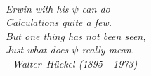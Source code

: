 

{
\thispagestyle{empty}
~\vfill

\begin{doublespace}
\noindent\fontsize{16}{22}\selectfont\itshape
\nohyphenation
\vspace*{-0.8em}%
Erwin with his $\psi$ can do\\
\vspace*{-0.8em}%
Calculations quite a few.\\
\vspace*{-0.8em}%
But one thing has not been seen,\\
Just what does $\psi$ really mean.\\
\noindent - \mbox{Walter H\"{u}ckel} (1895 - 1973)
\end{doublespace}

\vfill
\vfill
}

